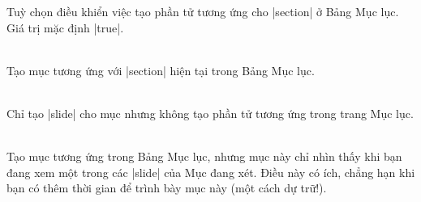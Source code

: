 Tuỳ chọn điều khiển việc tạo phần tử tương ứng cho |section| ở Bảng Mục lục.
Giá trị mặc định |true|.
\begin{description}
\item{}\\
Tạo mục tương ứng với |section| hiện tại trong Bảng Mục lục.
\item{}\\
Chỉ tạo |slide| cho mục nhưng không tạo phần tử tương ứng trong trang Mục lục.
\item{}\\
Tạo mục tương ứng trong Bảng Mục lục, nhưng mục này chỉ nhìn thấy khi bạn
đang xem một trong các |slide| của Mục đang xét. Điều này có ích, chẳng hạn khi
bạn có thêm thời gian để trình bày mục này (một cách dự trữ!).
\end{description}

